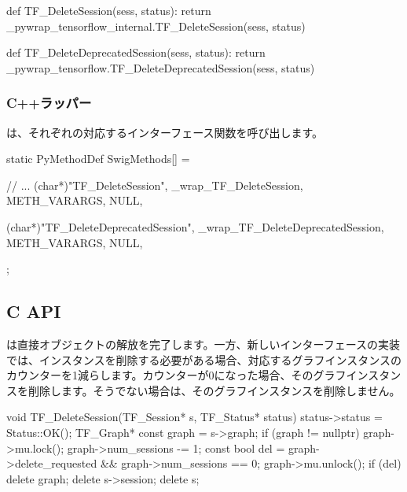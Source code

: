 \begin{content}
\begin{leftbar}
\begin{python}[caption={tensorflow/bazel-bin/tensorflow/python/pywrap\_tensorflow\_internal.py}]
def TF_DeleteSession(sess, status):
    return _pywrap_tensorflow_internal.TF_DeleteSession(sess, status)

def TF_DeleteDeprecatedSession(sess, status):
  return _pywrap_tensorflow.TF_DeleteDeprecatedSession(sess, status)
\end{python}
\end{leftbar}

\subsubsection{C++ラッパー}

は、それぞれの対応するインターフェース関数を呼び出します。

\begin{leftbar}
\begin{c++}[caption={tensorflow/bazel-bin/tensorflow/python/pywrap\_tensorflow\_internal.cc}]
static PyMethodDef SwigMethods[] = {
  // ...
  { (char*)"TF_DeleteSession", 
    _wrap_TF_DeleteSession, METH_VARARGS, NULL},

  { (char*)"TF_DeleteDeprecatedSession", 
    _wrap_TF_DeleteDeprecatedSession, METH_VARARGS, NULL},
};
\end{c++}
\end{leftbar}

\subsection{C API}

は直接オブジェクトの解放を完了します。一方、新しいインターフェースの実装では、インスタンスを削除する必要がある場合、対応するグラフインスタンスのカウンターを1減らします。カウンターが0になった場合、そのグラフインスタンスを削除します。そうでない場合は、そのグラフインスタンスを削除しません。

\begin{leftbar}
\begin{c++}[caption={tensorflow/c/c\_api.c}]
void TF_DeleteSession(TF_Session* s, TF_Status* status) {
  status->status = Status::OK();
  TF_Graph* const graph = s->graph;
  if (graph != nullptr) {
    graph->mu.lock();
    graph->num_sessions -= 1;
    const bool del = graph->delete_requested && graph->num_sessions == 0;
    graph->mu.unlock();
    if (del) delete graph;
  }
  delete s->session;
  delete s;
}


\end{c++}
\end{leftbar}
\end{content}
